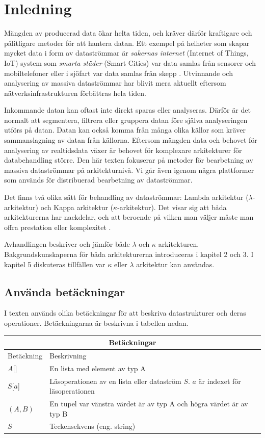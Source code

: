 \chapter{Inledning}

Mängden av producerad data ökar helta tiden, och kräver därför kraftigare och pålitligare
metoder för att hantera datan. Ett exempel på helheter som skapar mycket data i form av
dataströmmar är \textit{sakernas internet} (Internet of Things, IoT) system som \textit{smarta städer}
(Smart Cities) var data samlas från sensorer och mobiltelefoner \citep{vakali2014smart}
eller i sjöfart var data samlas från skepp \citep{xu2019internet}. Utvinnande och analysering
av massiva dataströmmar har blivit mera aktuellt eftersom nätverksinfrastrukturen förbättras hela tiden.

Inkommande datan  kan oftast inte direkt sparas eller analyseras. Därför är det normalt att
segmentera, filtrera eller gruppera datan före själva analyseringen utförs på datan.
Datan kan också komma från många olika källor \citep{beringer2006online} som kräver sammanslagning
av datan från källorna. Eftersom mängden data och behovet för analysering av realtidsdata växer
är behovet för komplexare arkitekturer för databehandling större. Den här texten fokuserar på metoder för
bearbetning av massiva dataströmmar på arkitekturnivå. Vi går även 
igenom några plattformer som används för distribuerad bearbetning av dataströmmar.

Det finns två olika sätt för behandling av dataströmmar: Lambda arkitektur 
($\lambda$-arkitektur) och Kappa arkitektur ($\kappa$-arkitektur). Det visar sig att
båda arkitekturerna har nackdelar, och att beroende på vilken man väljer måste man
offra prestation eller komplexitet \citep{mci/Feick2018}.

Avhandlingen beskriver och jämför både $\lambda$ och $\kappa$ arkitekturen. Bakgrundskunskaperna
för båda arkitekturerna introduceras i kapitel 2 och 3. I kapitel 5 diskuteras tillfällen var $\kappa$ 
eller $\lambda$ arkitektur kan användas.

\section{Använda betäckningar}

I texten används olika betäckningar för att beskriva datastrukturer och deras operationer. Betäckningarna är beskrivna i tabellen nedan.

\begin{tabular}{ |p{3cm}||p{8cm}|  }
 \hline
 \multicolumn{2}{|c|}{Betäckningar} \\
 \hline
 Betäckning & Beskrivning\\
 \hline
  $A$[]   &  En lista med element av typ A \\
 $S$[$a$]   &  Läsoperationen av en lista eller dataström $S$. $a$ är indexet för läsoperationen \\
 $(A, B)$   &  En tupel var vänstra värdet är av typ A och högra värdet är av typ B\\
 $S$ & Teckensekvens (eng. string)\\
 \hline
\end{tabular}



